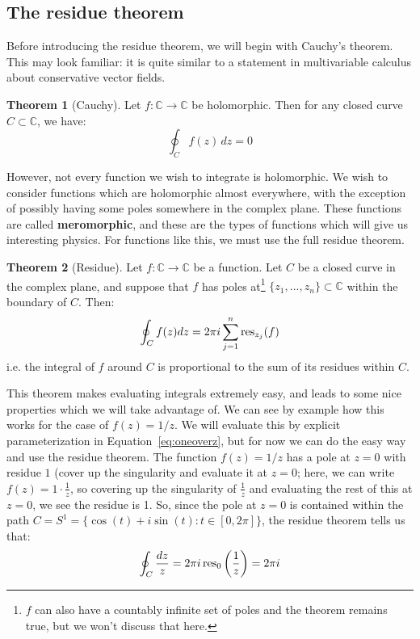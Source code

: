\documentclass[11pt, oneside]{article}   	%
\theoremstyle{definition}
\newtheorem{theorem}{Theorem}[section]
\newcommand{\res}{\textnormal{res}}
\begin{document}
\subsection{The residue theorem}

Before introducing the residue theorem, we will begin with Cauchy's theorem. This may look familiar: it is quite similar to a 
statement in multivariable calculus about conservative vector fields.
\begin{theorem}[Cauchy]
	Let $f : \mathbb C\rightarrow\mathbb C$ be holomorphic. Then for any closed curve $C\subset\mathbb C$, we have:
	\begin{equation}
		\oint_C f(z)\, dz = 0
	\end{equation}
\end{theorem}
However, not every function we wish to integrate is holomorphic. We wish to consider functions which are holomorphic almost 
everywhere, with the exception of possibly having some poles somewhere in the complex plane. These functions 
are called \textbf{meromorphic}, and these are the types of functions which will give us interesting physics. 
For functions like this, we must use the full residue theorem. 
\begin{theorem}[Residue]
	Let $f : \mathbb C\rightarrow\mathbb C$ be a function. Let $C$ be a closed curve in the complex plane, and suppose that 
	$f$ has poles at\footnote{$f$ can also have a countably infinite 
	set of poles and the theorem remains true, but we won't discuss that here.} $\{z_1, ..., z_n\}\subset\mathbb C$ within 
	the boundary of $C$. Then:
	\begin{equation}
		\oint_C f(z)dz = 2\pi i\sum_{j = 1}^n \res_{z_j}(f)
	\end{equation}
	i.e. the integral of $f$ around $C$ is proportional to the sum of its residues within $C$. 
\end{theorem}
This theorem makes evaluating integrals extremely easy, and leads to some nice properties which we will take advantage of. 
We can see by example how this works for the case of $f(z) = 1/z$. We will evaluate this by explicit parameterization 
in Equation~\ref{eq:oneoverz}, but for now we can do the easy way and use the residue theorem. The function $f(z) = 1/z$ has 
a pole at $z = 0$ with residue $1$ (cover up the singularity and evaluate it at $z = 0$; here, we can write $f(z) = 
1\cdot\frac{1}{z}$, so covering up the singularity of $\frac{1}{z}$ and evaluating the rest of this at $z = 0$, we see the 
residue is 1. So, since the pole at $z = 0$ is contained within the path $C = S^1 = \{\cos(t) + i\sin(t) : t\in [0, 2\pi]\}$, the residue 
theorem tells us that:
\begin{equation}
	\oint_C\frac{dz}{z} = 2\pi i \,\res_{0}\left(\frac{1}{z}\right) = 2\pi i
\end{equation}
\end{document}
